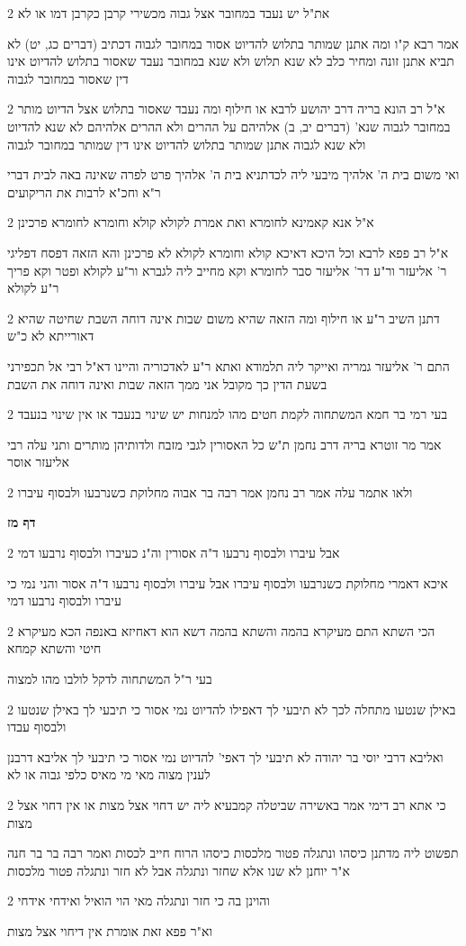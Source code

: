 \documentclass[12pt, openany]{book}
\newcommand{\sethebfont}{
\fontsize{10.5pt}{21.0pt} \selectfont
}
\newcommand{\twocol}[1]{
	{\sethebfont \begin{multicols}{2}
			#1
	\end{multicols}}	
}
\newcommand{\sectname}{}
\newcommand{\newsection}[1]{
	\addcontentsline{toc}{section}{#1}
	\renewcommand{\sectname}{#1}	
	\vspace{-\baselineskip}
	\begin{center}
		\textbf{%
\fontsize{16pt}{16pt}\selectfont
			#1}
	\end{center}
	\vspace{-\baselineskip}
	\nopagebreak
}
\begin{document}
\twocol{את"ל יש נעבד במחובר אצל גבוה מכשירי קרבן כקרבן דמו או לא
\par אמר רבא ק"ו ומה אתנן שמותר בתלוש להדיוט אסור במחובר לגבוה דכתיב (דברים כג, יט) לא תביא אתנן זונה ומחיר כלב לא שנא תלוש ולא שנא במחובר נעבד שאסור בתלוש להדיוט אינו דין שאסור במחובר לגבוה}
\twocol{א"ל רב הונא בריה דרב יהושע לרבא או חילוף ומה נעבד שאסור בתלוש אצל הדיוט מותר במחובר לגבוה שנא' (דברים יב, ב) אלהיהם על ההרים ולא ההרים אלהיהם לא שנא להדיוט ולא שנא לגבוה אתנן שמותר בתלוש להדיוט אינו דין שמותר במחובר לגבוה
\par ואי משום בית ה' אלהיך מיבעי ליה לכדתניא בית ה' אלהיך פרט לפרה שאינה באה לבית דברי ר"א וחכ"א לרבות את הריקועים}
\twocol{א"ל אנא קאמינא לחומרא ואת אמרת לקולא קולא וחומרא לחומרא פרכינן
\par א"ל רב פפא לרבא וכל היכא דאיכא קולא וחומרא לקולא לא פרכינן והא הזאה דפסח דפליגי ר' אליעזר ור"ע דר' אליעזר סבר לחומרא וקא מחייב ליה לגברא ור"ע לקולא ופטר וקא פריך ר"ע לקולא}
\twocol{דתנן השיב ר"ע או חילוף ומה הזאה שהיא משום שבות אינה דוחה השבת שחיטה שהיא דאורייתא לא כ"ש
\par התם ר' אליעזר גמריה ואייקר ליה תלמודא ואתא ר"ע לאדכוריה והיינו דא"ל רבי אל תכפירני בשעת הדין כך מקובל אני ממך הזאה שבות ואינה דוחה את השבת}
\twocol{בעי רמי בר חמא המשתחוה לקמת חטים מהו למנחות יש שינוי בנעבד או אין שינוי בנעבד
\par אמר מר זוטרא בריה דרב נחמן ת"ש כל האסורין לגבי מזבח ולדותיהן מותרים ותני עלה רבי אליעזר אוסר}
\twocol{ולאו אתמר עלה אמר רב נחמן אמר רבה בר אבוה מחלוקת כשנרבעו ולבסוף עיברו}
\newsection{דף מז}
\twocol{אבל עיברו ולבסוף נרבעו ד"ה אסורין וה"נ כעיברו ולבסוף נרבעו דמי
\par איכא דאמרי מחלוקת כשנרבעו ולבסוף עיברו אבל עיברו ולבסוף נרבעו ד"ה אסור והני נמי כי עיברו ולבסוף נרבעו דמי}
\twocol{הכי השתא התם מעיקרא בהמה והשתא בהמה דשא הוא דאחיזא באנפה הכא מעיקרא חיטי והשתא קמחא
\par בעי ר"ל המשתחוה לדקל לולבו מהו למצוה}
\twocol{באילן שנטעו מתחלה לכך לא תיבעי לך דאפילו להדיוט נמי אסור כי תיבעי לך באילן שנטעו ולבסוף עבדו
\par ואליבא דרבי יוסי בר יהודה לא תיבעי לך דאפי' להדיוט נמי אסור כי תיבעי לך אליבא דרבנן לענין מצוה מאי מי מאיס כלפי גבוה או לא}
\twocol{כי אתא רב דימי אמר באשירה שביטלה קמבעיא ליה יש דחוי אצל מצות או אין דחוי אצל מצות
\par תפשוט ליה מדתנן כיסהו ונתגלה פטור מלכסות כיסהו הרוח חייב לכסות ואמר רבה בר בר חנה א"ר יוחנן לא שנו אלא שחזר ונתגלה אבל לא חזר ונתגלה פטור מלכסות}
\twocol{והוינן בה כי חזר ונתגלה מאי הוי הואיל ואידחי אידחי
\par וא"ר פפא זאת אומרת אין דיחוי אצל מצות}
\end{document}
